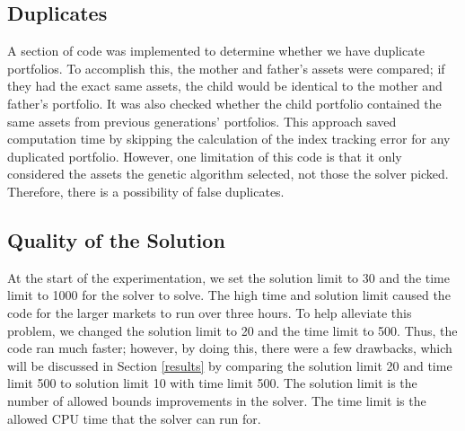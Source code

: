 \documentclass[12pt]{report}
\begin{document}
\subsection*{Duplicates}
A section of code was implemented to determine whether we have duplicate portfolios. To accomplish this, the mother and father's assets were compared; if they had the exact same assets, the child would be identical to the mother and father's portfolio. It was also checked whether the child portfolio contained the same assets from previous generations' portfolios. This approach saved computation time by skipping the calculation of the index tracking error for any duplicated portfolio. However, one limitation of this code is that it only considered the assets the genetic algorithm selected, not those the solver picked. Therefore, there is a possibility of false duplicates. 

\subsection*{Quality of the Solution}
At the start of the experimentation, we set the solution limit to 30 and the time limit to 1000 for the solver to solve. The high time and solution limit caused the code for the larger markets to run over three hours. To help alleviate this problem, we changed the solution limit to 20 and the time limit to 500. Thus, the code ran much faster; however, by doing this, there were a few drawbacks, which will be discussed in Section \ref{results} by comparing the solution limit 20 and time limit 500 to solution limit 10 with time limit 500. The solution limit is the number of allowed bounds improvements in the solver. The time limit is the allowed CPU time that the solver can run for.
\end{document}
